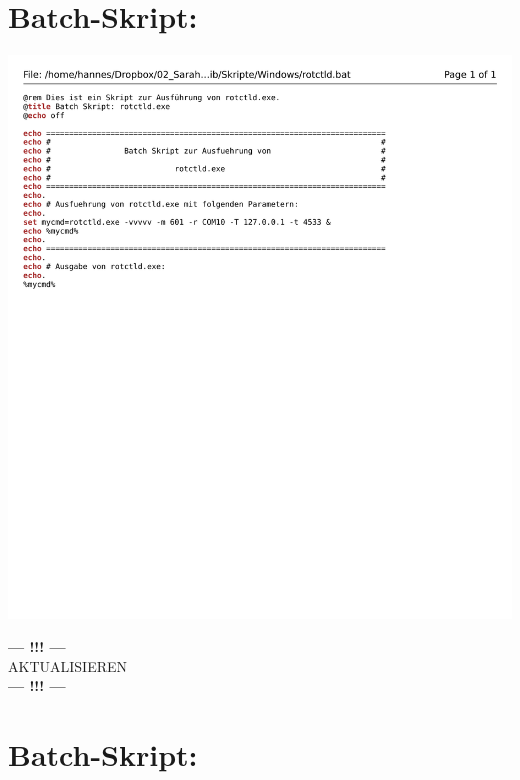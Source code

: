 
\chapter{Batch-Skript: }
\label{chap:rotctldbat}

\begin{center}
	\includegraphics[width=1\textwidth]{./appendicies/rotctld-windows}
\end{center}

\begin{center}
	\Large{\textbf{--- !!! ---}\\AKTUALISIEREN\\\textbf{--- !!! ---}}
\end{center}


\chapter{Batch-Skript: }
\label{chap:rigctlddummybat}

